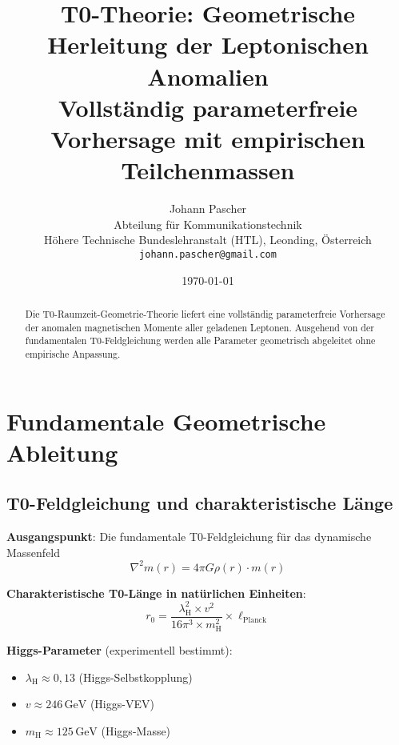 \documentclass[12pt,a4paper]{article}
\newcommand{\lambdaH}{\lambda_{\text{H}}}
\newcommand{\ellPlanck}{\ell_{\text{Planck}}}
\newcommand{\rzero}{r_0}
\begin{document}
	
	\title{T0-Theorie: Geometrische Herleitung der Leptonischen Anomalien \\
		\large Vollst\"andig parameterfreie Vorhersage mit empirischen Teilchenmassen}
	\author{Johann Pascher\\
		Abteilung f\"ur Kommunikationstechnik\\
		H\"ohere Technische Bundeslehranstalt (HTL), Leonding, \"Osterreich\\
		\texttt{johann.pascher@gmail.com}}
	\date{\today}
	
	\maketitle
	
	\begin{abstract}
		Die T0-Raumzeit-Geometrie-Theorie liefert eine vollst\"andig parameterfreie Vorhersage der anomalen magnetischen Momente aller geladenen Leptonen. Ausgehend von der fundamentalen T0-Feldgleichung werden alle Parameter geometrisch abgeleitet ohne empirische Anpassung.
	\end{abstract}
	
	\tableofcontents
	\newpage
	
	\section{Fundamentale Geometrische Ableitung}
	
	\subsection{T0-Feldgleichung und charakteristische L\"ange}
	
	\textbf{Ausgangspunkt}: Die fundamentale T0-Feldgleichung f\"ur das dynamische Massenfeld
	\begin{equation}
		\nabla^2 m(r) = 4\pi G \rho(r) \cdot m(r)
	\end{equation}
	
	\textbf{Charakteristische T0-L\"ange in nat\"urlichen Einheiten}:
	\begin{equation}
		\rzero = \frac{\lambdaH^2 \times v^2}{16\pi^3 \times m_{\text{H}}^2} \times \ellPlanck
	\end{equation}
	
	\textbf{Higgs-Parameter} (experimentell bestimmt):
	\begin{itemize}
		\item $\lambdaH \approx 0{,}13$ (Higgs-Selbstkopplung)
		\item $v \approx 246\,\text{GeV}$ (Higgs-VEV)
		\item $m_{\text{H}} \approx 125\,\text{GeV}$ (Higgs-Masse)
	\end{itemize}
	
\end{document}
